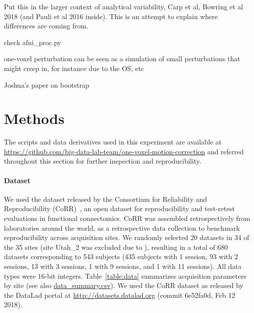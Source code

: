 \documentclass[11pt]{IEEEtran}
\begin{document}
Put this in the larger context of analytical variability, Carp et al, Bowring et al 2018 (and Pauli et al 2016 inside).
This is an attempt to explain where differences are coming from.

check afni\_proc.py

one-voxel perturbation can be seen as a simulation of small perturbations that might creep in, for instance due to the OS, 
etc

Joshua's paper on bootstrap



\newpage

\section{Methods}

The scripts and data derivatives used in this experiment are available at
\url{https://github.com/big-data-lab-team/one-voxel-motion-correction} and
referred throughout this section for further inspection and
reproducibility.

\paragraph{Dataset}
We used the dataset released by the Consortium for Reliability and
Reproducibility (CoRR)~\cite{zuo2014open}, an open dataset for
reproducibility and test-retest evaluations in functional connectomics.
CoRR was assembled retrospectively from laboratories around the world, as a
retrospective data collection to benchmark reproducibility across
acquisition sites. We randomly selected 20 datasets in 34 of the 35 sites
(site Utah\_2 was excluded due to ), resulting in a total of 680
datasets corresponding to 543 subjects (435 subjects with 1 session, 93
with 2 sessions, 13 with 3 sessions, 1 with 9 sessions, and 1 with 11
sessions). All data types were 16-bit integers. Table~\ref{table:data}
summarizes acquisition parameters by site (see also
\href{https://github.com/big-data-lab-team/one-voxel-motion-correction/data\_summary.csv}{data\_summary.csv}).
We used the CoRR dataset as released by the DataLad portal at
\url{http://datasets.datalad.org} (commit 6e52fa0d, Feb 12 2018).
\end{document}
